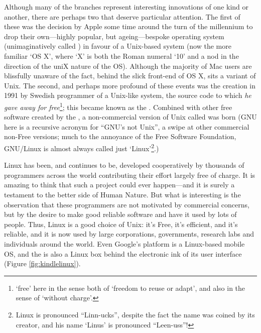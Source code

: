 Although many of the branches represent interesting innovations of one kind or another, there are perhaps two that deserve particular attention. The first of these was the decision by Apple some time around the turn of the millennium to drop their own---highly popular, but ageing---bespoke operating system (unimaginatively called ) in favour of a Unix-based system (now the more familiar `OS X', where `X' is both the Roman numeral `10' and a nod in the direction of the uniX nature of the OS). Although the majority of Mac users are blissfully unaware of the fact, behind the slick front-end of OS X, sits a variant of Unix. The second, and perhaps more profound of these events was the creation in 1991 by Swedish programmer  of a Unix-like system, the source code to which \emph{he gave away for free}\footnote{`free' here in the sense both of `freedom to reuse or adapt', and also in the sense of `without charge'.}; this became known as the . Combined with other free software created by the , a non-commercial version of Unix called  was born (GNU here is a recursive acronym for ``GNU's not Unix'', a swipe at other commercial non-Free versions; much to the annoyance of the Free Software Foundation, GNU/Linux is almost always called just `Linux'\footnote{Linux
is pronounced ``Linn-ucks'', despite the fact the name was coined by
its creator, and his name `Linus' is pronounced
``Leen-uss''!}.)

Linux has been, and continues to be, developed cooperatively by
thousands of programmers across the world contributing their effort
largely free of charge. It is amazing to think that such
a project could ever happen---and it is surely a testament to the
better side of Human Nature. But what is interesting is the
observation that these programmers are not motivated by commercial
concerns, but by the desire to make good reliable software and have it
used by lots of people. Thus, Linux is a good choice of Unix: it's
Free, it's efficient, and it's reliable, and it is now used by large corporations, governments, research labs and individuals around the world. Even Google's  platform is a Linux-based mobile OS, and the   is also a Linux box behind the electronic ink of its user interface (Figure \ref{fig:kindlelinux}).

